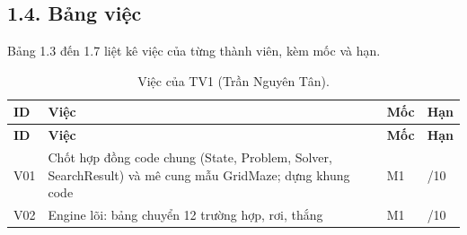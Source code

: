 \subsection{1.4. Bảng việc}

Bảng 1.3 đến 1.7 liệt kê việc của từng thành viên, kèm mốc và hạn.


\begin{longtable}[]{@{}
  >{\raggedright\arraybackslash}p{}
  >{\raggedright\arraybackslash}p{}
  >{\raggedright\arraybackslash}p{}
  >{\raggedright\arraybackslash}p{}@{}}
\caption{ Việc của TV1 (Trần Nguyên Tân).}\tabularnewline
\toprule\noalign{}
\rowcolor{tablehead}\begin{minipage}[b]{\linewidth}\raggedright
\textbf{ID}
\end{minipage} & \begin{minipage}[b]{\linewidth}\raggedright
\textbf{Việc}
\end{minipage} & \begin{minipage}[b]{\linewidth}\raggedright
\textbf{Mốc}
\end{minipage} & \begin{minipage}[b]{\linewidth}\raggedright
\textbf{Hạn}
\end{minipage} \\
\midrule\noalign{}
\endfirsthead
\toprule\noalign{}
\rowcolor{tablehead}\begin{minipage}[b]{\linewidth}\raggedright
\textbf{ID}
\end{minipage} & \begin{minipage}[b]{\linewidth}\raggedright
\textbf{Việc}
\end{minipage} & \begin{minipage}[b]{\linewidth}\raggedright
\textbf{Mốc}
\end{minipage} & \begin{minipage}[b]{\linewidth}\raggedright
\textbf{Hạn}
\end{minipage} \\
\midrule\noalign{}
\endhead
\bottomrule\noalign{}
\endlastfoot
V01 & Chốt hợp đồng code chung (State, Problem, Solver, SearchResult) và mê cung mẫu GridMaze; dựng khung code & M1 & 19/10 \\
\rowrule
V02 & Engine lõi: bảng chuyển 12 trường hợp, rơi, thắng & M1 & 20/10 \\

\end{longtable}
